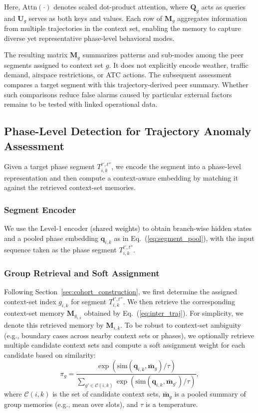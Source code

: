 \documentclass[iicol,pdflatex,sn-basic,Numbered]{sn-jnl}%
\theoremstyle{thmstyleone}%
\theoremstyle{thmstyletwo}%
\theoremstyle{thmstylethree}%
\begin{document}
Here, $\mathrm{Attn}(\cdot)$ denotes scaled dot-product attention, where $\mathbf{Q}_g$ acts as queries and $\mathbf{U}_g$ serves as both keys and values. Each row of $\mathbf{M}_g$ aggregates information from multiple trajectories in the context set, enabling the memory to capture diverse yet representative phase-level behavioral modes.

The resulting matrix $\mathbf{M}_g$ summarizes patterns and sub-modes among the peer segments assigned to context set $g$. It does not explicitly encode weather, traffic demand, airspace restrictions, or ATC actions.
The subsequent assessment compares a target segment with this trajectory-derived peer summary. Whether such comparisons reduce false alarms caused by particular external factors remains to be tested with linked operational data.

\subsection{Phase-Level Detection for Trajectory Anomaly Assessment}
\label{sec:segment_detection}
Given a target phase segment $T^{t',t''}_{i,k}$, we encode the segment into a phase-level representation and then compute a context-aware embedding by matching it against the retrieved context-set memories.


\subsubsection{Segment Encoder}

We use the Level-1 encoder (shared weights) to obtain branch-wise hidden states and a pooled phase embedding $\mathbf{q}_{i,k}$ as in Eq.~(\ref{eq:segment_pool}), with the input sequence taken as the phase segment $T^{t',t''}_{i,k}$.


\subsubsection{Group Retrieval and Soft Assignment}

Following Section~\ref{sec:cohort_construction}, we first determine the assigned context-set index $g_{i,k}$ for segment $T^{t',t''}_{i,k}$.
We then retrieve the corresponding context-set memory $\mathbf{M}_{g_{i,k}}$ obtained by Eq.~(\ref{eq:inter_traj}).
For simplicity, we denote this retrieved memory by $\mathbf{M}_{i,k}$.
To be robust to context-set ambiguity (e.g., boundary cases across nearby context sets or phases), we optionally retrieve multiple candidate context sets and compute a soft assignment weight for each candidate based on similarity:
\begin{equation}
\label{eq:soft_assign}
\pi_g = \frac{\exp(\text{sim}(\mathbf{q}_{i,k}, \bar{\mathbf{m}}_g)/\tau)}{\sum\limits_{g'\in\mathcal{C}(i,k)} \exp(\text{sim}(\mathbf{q}_{i,k}, \bar{\mathbf{m}}_{g'})/\tau)},
\end{equation}
where $\mathcal{C}(i,k)$ is the set of candidate context sets, $\bar{\mathbf{m}}_g$ is a pooled summary of group memories (e.g., mean over slots), and $\tau$ is a temperature.
\end{document}
